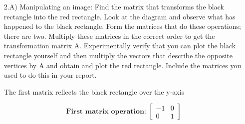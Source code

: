 \documentclass[10pt]{article}
\begin{document}
\begin{enumerate}[leftmargin=\labelsep]
    \item[2.A)] Manipulating an image: Find the matrix that transforms the black rectangle into the red rectangle. Look at the diagram and observe what has happened to the black rectangle. Form the matrices that do these operations; there are two. Multiply these matrices in the correct order to get the transformation matrix A. Experimentally verify that you can plot the black rectangle yourself and then multiply the vectors that describe the opposite vertices by A and obtain and plot the red rectangle. Include the matrices you used to do this in your report.
    
    The first matrix reflects the black rectangle over the y-axis 
    
     $$
    \textbf{First matrix operation: }\begin{bmatrix} -1 & 0 \\ 0 & 1
    \end{bmatrix}
    $$
    

\end{enumerate}
\end{document}
